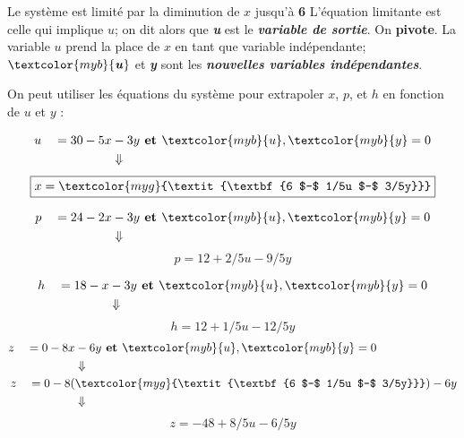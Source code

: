 \documentclass{report}
\begin{document}
\begin{multicols*}{3}
Le système est limité par la diminution de $x$ jusqu'à \textcolor{myr}{\textbf{6}} 
L'équation limitante est celle qui implique $u$; on dit alors que 
\textcolor{myr}{\textbf{\textit{u}}} est le 
\textcolor{myr}{\textbf{\textit{variable de sortie}}}. On 
\textbf{pivote}. La variable $u$ prend la place de $x$ en tant que
variable indépendante;
$\textcolor{myb}{\textbf{\textit{u}}}$ et  
\textcolor{myb}{\textbf{\textit{y}}} sont les 
\textcolor{myb}{\textbf{\textit{nouvelles variables indépendantes}}}.   

On peut utiliser les équations du système pour extrapoler 
$x$, $p$, et $h$ en fonction de $u$ et $y$ :


\begin{align*}
    u \quad = 30 - 5x &- 3y 
    \textbf{ et } \textcolor{myb}{u}, \textcolor{myb}{y} = 0 
    \\
                         &\Downarrow
\end{align*}
      \[%
          \boxed{x = \textcolor{myg}{\textit{\textbf{6 $-$ 1/5u $-$ 3/5y}}}}
      \]%


\begin{align*}
    p \quad = 24 - 2x &- 3y
    \textbf{ et } \textcolor{myb}{u}, \textcolor{myb}{y} = 0 
    \\
                 &\Downarrow
\end{align*}
      \[%
    \boxed{p = 12 +2/5u -9/5y}
      \]%

\begin{align*}
    h \quad = 18 - x &- 3y
    \textbf{ et } \textcolor{myb}{u}, \textcolor{myb}{y} = 0 
    \\
                     &\Downarrow
\end{align*}
      \[%
    \boxed{h = 12 +1/5u -12/5y}
      \]%
\begin{align*}
    z \quad = 0 - 8x &- 6y
    \textbf{ et } \textcolor{myb}{u}, \textcolor{myb}{y} = 0 
    \\
                     &\Downarrow
    \\
    z \quad = 0 - 8(&\textcolor{myg}{\textit{\textbf{6 $-$ 1/5u $-$ 3/5y}}})
 - 6y
    \\ 
                    &\Downarrow
\end{align*}
      \[%
    \boxed{z = -48 +8/5u -6/5y}
      \]%


\end{multicols*}
\end{document}

